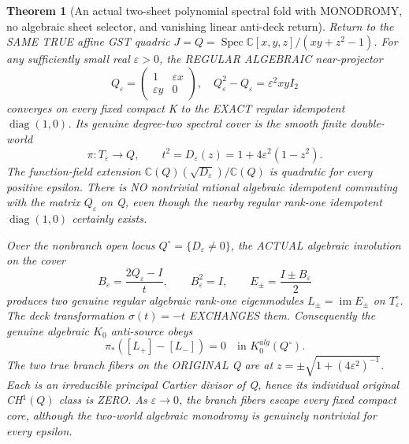 \documentclass[11pt]{article}
\newtheorem{theorem}{Theorem}[section]
\begin{document}
\begin{theorem}[An actual two-sheet polynomial spectral fold with MONODROMY, no algebraic sheet selector, and vanishing linear anti-deck return]
Return to the SAME TRUE affine GST quadric
$J=Q=\operatorname{Spec}
 \mathbb C[x,y,z]/(xy+z^2-1)$.
For any sufficiently small
real $\varepsilon>0$, the
REGULAR ALGEBRAIC near-projector
\[
 \boxed{
 Q_\varepsilon=
 \begin{pmatrix}
   1&\varepsilon x\\
   \varepsilon y&0
 \end{pmatrix},
 \quad
 Q_\varepsilon^2-Q_\varepsilon
       =\varepsilon^2xy I_2}                  \tag{60}
\]
converges on every fixed compact
K to the EXACT regular idempotent
$\operatorname{diag}(1,0)$.
Its genuine degree-two spectral cover
is the smooth finite double-world
\[
 \boxed{
 \pi:T_\varepsilon\to Q,\qquad
 t^2=D_\varepsilon(z)
 =1+4\varepsilon^2(1-z^2).}                  \tag{61}
\]
The function-field extension
$\mathbb C(Q)(\sqrt{D_\varepsilon})/
 \mathbb C(Q)$ is quadratic
for every positive epsilon.
There is NO nontrivial
rational algebraic idempotent
commuting with the matrix
$Q_\varepsilon$ on Q,
even though the nearby
regular rank-one idempotent
$\operatorname{diag}(1,0)$
certainly exists.

Over the nonbranch open locus
$Q^\circ=\{D_\varepsilon\ne0\}$,
the ACTUAL algebraic involution
on the cover
\[
 B_\varepsilon
 =\frac{2Q_\varepsilon-I}{t},
 \qquad B_\varepsilon^2=I,\qquad
 E_\pm=\frac{I\pm B_\varepsilon}{2}
\]
produces two genuine regular
algebraic rank-one eigenmodules
$L_\pm=\operatorname{im}E_\pm$ on
$T_\varepsilon^\circ$.
The deck transformation
$\sigma(t)=-t$ EXCHANGES them.
Consequently the genuine
algebraic $K_0$ anti-source
obeys
\[
 \boxed{
 \pi_*([L_+]-[L_-])=0
        \quad\text{in }
          K_0^{alg}(Q^\circ).}                \tag{62}
\]
The two true branch fibers on
the ORIGINAL Q are at
$z=\pm\sqrt{1+(4\varepsilon^2)^{-1}}$.
Each is an irreducible
principal Cartier divisor of Q,
hence its individual original
CH$^1(Q)$ class is ZERO.
As $\varepsilon\to0$, the branch
fibers escape every fixed compact
core, although the two-world
algebraic monodromy is genuinely
nontrivial for every epsilon.
\end{theorem}
\end{document}
